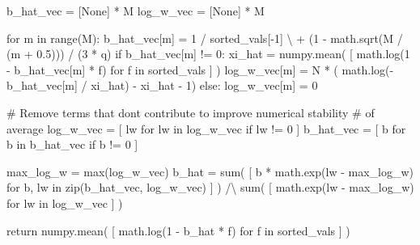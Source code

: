 \documentclass[
  letterpaper,
  DIV=11,
  numbers=noendperiod]{scrartcl}
\newenvironment{Shaded}{\begin{snugshade}}{\end{snugshade}}
\newcommand{\BuiltInTok}[1]{\textcolor[rgb]{0.00,0.23,0.31}{#1}}
\newcommand{\CommentTok}[1]{\textcolor[rgb]{0.37,0.37,0.37}{#1}}
\newcommand{\ControlFlowTok}[1]{\textcolor[rgb]{0.00,0.23,0.31}{#1}}
\newcommand{\DecValTok}[1]{\textcolor[rgb]{0.68,0.00,0.00}{#1}}
\newcommand{\FloatTok}[1]{\textcolor[rgb]{0.68,0.00,0.00}{#1}}
\newcommand{\KeywordTok}[1]{\textcolor[rgb]{0.00,0.23,0.31}{#1}}
\newcommand{\NormalTok}[1]{\textcolor[rgb]{0.00,0.23,0.31}{#1}}
\newcommand{\OperatorTok}[1]{\textcolor[rgb]{0.37,0.37,0.37}{#1}}
\newcommand{\VariableTok}[1]{\textcolor[rgb]{0.07,0.07,0.07}{#1}}
\begin{document}
\begin{Shaded}
\begin{Highlighting}[]
\NormalTok{  b\_hat\_vec }\OperatorTok{=}\NormalTok{ [}\VariableTok{None}\NormalTok{] }\OperatorTok{*}\NormalTok{ M}
\NormalTok{  log\_w\_vec }\OperatorTok{=}\NormalTok{ [}\VariableTok{None}\NormalTok{] }\OperatorTok{*}\NormalTok{ M}
  
  \ControlFlowTok{for}\NormalTok{ m }\KeywordTok{in} \BuiltInTok{range}\NormalTok{(M):}
\NormalTok{    b\_hat\_vec[m] }\OperatorTok{=}   \DecValTok{1} \OperatorTok{/}\NormalTok{ sorted\_vals[}\OperatorTok{{-}}\DecValTok{1}\NormalTok{] }\OperatorTok{\textbackslash{}}
                   \OperatorTok{+}\NormalTok{ (}\DecValTok{1} \OperatorTok{{-}}\NormalTok{ math.sqrt(M }\OperatorTok{/}\NormalTok{ (m }\OperatorTok{+} \FloatTok{0.5}\NormalTok{))) }\OperatorTok{/}\NormalTok{ (}\DecValTok{3} \OperatorTok{*}\NormalTok{ q)}
    \ControlFlowTok{if}\NormalTok{ b\_hat\_vec[m] }\OperatorTok{!=} \DecValTok{0}\NormalTok{:}
\NormalTok{      xi\_hat }\OperatorTok{=}\NormalTok{ numpy.mean( [ math.log(}\DecValTok{1} \OperatorTok{{-}}\NormalTok{ b\_hat\_vec[m] }\OperatorTok{*}\NormalTok{ f) }
                             \ControlFlowTok{for}\NormalTok{ f }\KeywordTok{in}\NormalTok{ sorted\_vals ] )}
\NormalTok{      log\_w\_vec[m] }\OperatorTok{=}\NormalTok{ N }\OperatorTok{*}\NormalTok{ (   math.log(}\OperatorTok{{-}}\NormalTok{b\_hat\_vec[m] }\OperatorTok{/}\NormalTok{ xi\_hat) }
                           \OperatorTok{{-}}\NormalTok{ xi\_hat }\OperatorTok{{-}} \DecValTok{1}\NormalTok{)}
    \ControlFlowTok{else}\NormalTok{:}
\NormalTok{      log\_w\_vec[m] }\OperatorTok{=} \DecValTok{0}

  \CommentTok{\# Remove terms that don\textquotesingle{}t contribute to improve numerical stability }
  \CommentTok{\# of average}
\NormalTok{  log\_w\_vec }\OperatorTok{=}\NormalTok{ [ lw }\ControlFlowTok{for}\NormalTok{ lw }\KeywordTok{in}\NormalTok{ log\_w\_vec }\ControlFlowTok{if}\NormalTok{ lw }\OperatorTok{!=} \DecValTok{0}\NormalTok{ ]}
\NormalTok{  b\_hat\_vec }\OperatorTok{=}\NormalTok{ [ b }\ControlFlowTok{for}\NormalTok{ b }\KeywordTok{in}\NormalTok{ b\_hat\_vec }\ControlFlowTok{if}\NormalTok{ b }\OperatorTok{!=} \DecValTok{0}\NormalTok{ ]}

\NormalTok{  max\_log\_w }\OperatorTok{=} \BuiltInTok{max}\NormalTok{(log\_w\_vec)}
\NormalTok{  b\_hat }\OperatorTok{=} \BuiltInTok{sum}\NormalTok{( [ b }\OperatorTok{*}\NormalTok{ math.exp(lw }\OperatorTok{{-}}\NormalTok{ max\_log\_w) }
               \ControlFlowTok{for}\NormalTok{ b, lw }\KeywordTok{in} \BuiltInTok{zip}\NormalTok{(b\_hat\_vec, log\_w\_vec) ] ) }\OperatorTok{/\textbackslash{}}
          \BuiltInTok{sum}\NormalTok{( [ math.exp(lw }\OperatorTok{{-}}\NormalTok{ max\_log\_w) }\ControlFlowTok{for}\NormalTok{ lw }\KeywordTok{in}\NormalTok{ log\_w\_vec ] )}

  \ControlFlowTok{return}\NormalTok{ numpy.mean( [ math.log(}\DecValTok{1} \OperatorTok{{-}}\NormalTok{ b\_hat }\OperatorTok{*}\NormalTok{ f) }\ControlFlowTok{for}\NormalTok{ f }\KeywordTok{in}\NormalTok{ sorted\_vals ] )}
\end{Highlighting}
\end{Shaded}
\end{document}

